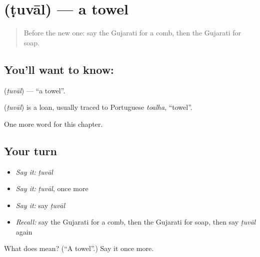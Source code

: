 \section[\texorpdfstring{\gu{ટુવાલ} (ṭuvāl)}{ટુવાલ (ṭuvāl)}]{ (ṭuvāl) — a towel}

\label{lesson:GU-C106-tuval}



\begin{quote}
Before the new one: say the Gujarati for a comb, then the Gujarati for soap.
\end{quote}

\subsection*{You'll want to know: }
\textbf{} (\emph{ṭuvāl}) — \textquotedblleft{}a towel\textquotedblright{}.

\begin{cousinweb}
\textbf{} (\emph{ṭuvāl}) is a loan, usually traced to Portuguese \emph{toalha}, \textquotedblleft{}towel\textquotedblright{}.
\end{cousinweb}

\begin{grammarlens}[title={What you've built}]
One more word for this chapter.
\end{grammarlens}

\subsection*{Your turn}
\begin{itemize}
\raggedright
  \item \emph{Say it:} \emph{ṭuvāl}
  \item \emph{Say it:} \emph{ṭuvāl}, once more
  \item \emph{Say it:} say \emph{ṭuvāl}
  \item \emph{Recall:} say the Gujarati for a comb, then the Gujarati for soap, then say \emph{ṭuvāl} again
\end{itemize}

\begin{tcolorbox}[breakable,colback=teal!4,colframe=teal!35!black,title={Before you move on}]
What does  mean? (\textquotedblleft{}A towel\textquotedblright{}.) Say it once more.
\end{tcolorbox}
